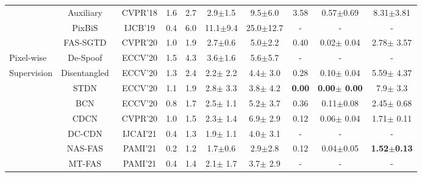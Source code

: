\documentclass[10pt,journal,compsoc]{IEEEtran}
\begin{document}
\begin{table}[!htb]
{\begin{tabular}{l|c|c|c|c|c|c|c|c|c}
   & Auxiliary~\cite{Liu2018Learning} & CVPR'18  & 1.6  & 2.7  & 2.9$\pm$1.5  & 9.5$\pm$6.0  & 3.58  & 0.57$\pm$0.69  & 8.31$\pm$3.81
    \\ \cline{2-10}
    
    & PixBiS~\cite{george2019deep} & IJCB'19  & 0.4  & 6.0  & 11.1$\pm$9.4  & 25.0$\pm$12.7  & -  & - & -
    \\ \cline{2-10}
    
    & FAS-SGTD~\cite{wang2020deep} & CVPR'20  & 1.0  & 1.9  & 2.7$\pm$0.6  & 5.0$\pm$2.2  & 0.40  & 0.02$\pm$ 0.04 & 2.78$\pm$ 3.57
    \\ \cline{2-10}
    
    
   
   Pixel-wise
   & De-Spoof~\cite{jourabloo2018face} & ECCV'20  & 1.5  & 4.3  & 3.6$\pm$1.6  & 5.6$\pm$5.7  & -  & -  & -
    \\ \cline{2-10}
    
    Supervision
   & Disentangled~\cite{zhang2020face} & ECCV'20  & 1.3  & 2.4  & 2.2$\pm$ 2.2  & 4.4$\pm$ 3.0  & 0.28  & 0.10$\pm$ 0.04  & 5.59$\pm$ 4.37
    \\ \cline{2-10}
    
   & STDN~\cite{liu2020disentangling} & ECCV'20  & 1.1  & 1.9  & 2.8$\pm$ 3.3  & 3.8$\pm$ 4.2  & \textbf{0.00}  & \textbf{0.00$\pm$ 0.00}  & 7.9$\pm$ 3.3
    \\ \cline{2-10}
    
    & BCN~\cite{yu2020face} & ECCV'20  & 0.8  & 1.7  & 2.5$\pm$ 1.1  & 5.2$\pm$ 3.7  & 0.36  & 0.11$\pm$0.08  & 2.45$\pm$ 0.68
    \\ \cline{2-10}
    
    
    & CDCN~\cite{yu2020searching} & CVPR'20  & 1.0  & 1.5  & 2.3$\pm$ 1.4  & 6.9$\pm$ 2.9  & 0.12  & 0.06$\pm$ 0.04  & 1.71$\pm$ 0.11
    \\ \cline{2-10}
    
    & DC-CDN~\cite{yu2021dual} & IJCAI'21  & 0.4  & 1.3  & 1.9$\pm$ 1.1  & 4.0$\pm$ 3.1  & -  & -  & -
    \\ \cline{2-10}
   
   & NAS-FAS~\cite{yu2020fas2} & PAMI'21 & 0.2  & 1.2  & 1.7$\pm$0.6  & 2.9$\pm$2.8  & 0.12  & 0.04$\pm$0.05  & \textbf{1.52$\pm$0.13}
   \\ \cline{2-10}
   
      & MT-FAS~\cite{qin2021meta} & PAMI'21  &  0.4 & 1.4  & 2.1$\pm$ 1.7  & 3.7$\pm$ 2.9  & -  & - & -
   
   
    \\ 
    
	\bottomrule[1pt]	
	\end{tabular}}
	
    \label{tab:semi_DG_intra}
    \vspace{-0.2em}
\end{table}
\end{document}
